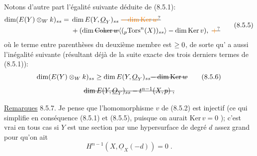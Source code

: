Notons d'autre part l'égalité suivante déduite de (8.5.1):
\[
\begin{aligned}
\dim(E(Y)\otimes_W k)_{ss}={}&\dim E(Y,\underline O_Y)_{ss}\ \deleted{\unsure{-\dim\mathrm{Ker}\,w}}\\
&+(\dim\deleted{\mathrm{Coker}\,w}\inserted{\handwritten{({}_p\mathrm{Tors}^n(X))_{ss}}}-\dim\mathrm{Ker}\,v)\handwritten{,}\ \deleted{\unsure{+}}
\end{aligned}
\tag*{(8.5.5)}
\]
où le terme entre parenthèses du deuxième membre est $\geq0$, de sorte qu'
a aussi l'inégalité suivante (résultant déjà de la suite exacte des trois derniers termes de (8.5.1)):
\[
\dim(E(Y)\otimes_W k)_{ss}\handwritten{\geq}\dim E(Y,\underline O_Y)_{ss}
\deleted{-\dim\mathrm{Ker}\,w}
\tag*{(8.5.6)}
\]
\[
\deleted{\dim E(Y,\underline O_Y)_{ss}-t^{n-1}(X,p)\;,}
\]

\uline{Remarques} 8.5.7. Je pense que l'homomorphisme $v$ de (8.5.2) est injectif\deleted{\unsure{,}} (ce qui simplifie en conséquence (8.5.1) et (8.5.5), puisque on aurait $\mathrm{Ker}\,v=0$ ); c'est vrai en tous cas si  $Y$ est  une section par une hypersurface de degré $d$ assez grand pour qu'on ait
\[
H^{n-1}(X,\underline O_X(-d))=0\;.
\]


